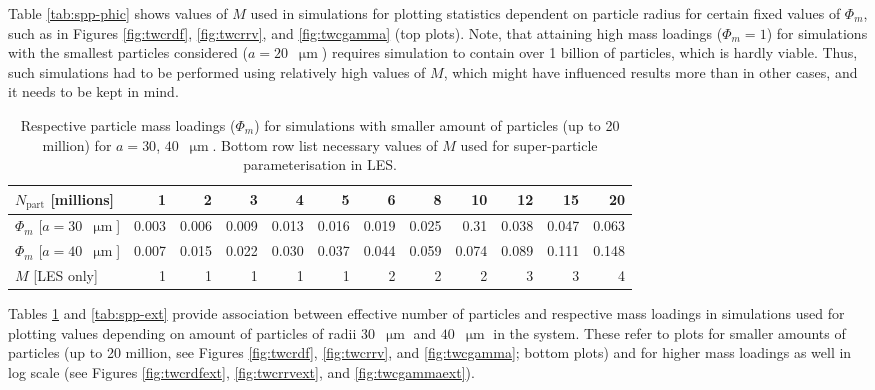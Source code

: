 \documentclass{pracamgren}
\begin{document}
Table \ref{tab:spp-phic} shows values of $M$ used in simulations for plotting statistics dependent on particle radius for certain fixed values of $\Phi_m$, such as in Figures \ref{fig:twcrdf}, \ref{fig:twcrrv}, and \ref{fig:twcgamma} (top plots).
Note, that attaining high mass loadings ($\Phi_m = 1$) for simulations with the smallest particles considered ($a = 20$~$\upmu\text{m}$) requires simulation to contain over 1 billion of particles, which is hardly viable.
Thus, such simulations had to be performed using relatively high values of $M$, which might have influenced results more than in other cases, and it needs to be kept in mind.

\begin{table}[h]
\centering
\scriptsize
\begin{tabular}{lrrrrrrrrrrr}
$N_{\text{part}}$ [millions] & 1 & 2 & 3 & 4 & 5 & 6 & 8 & 10 & 12 & 15 & 20 \\ \hline
$\Phi_m$ [$a = 30$~$\upmu\text{m}$] & 0.003 & 0.006 & 0.009 & 0.013 & 0.016 & 0.019 & 0.025 & 0.31 & 0.038 & 0.047 & 0.063 \\
$\Phi_m$ [$a = 40$~$\upmu\text{m}$] & 0.007 & 0.015 & 0.022 & 0.030 & 0.037 & 0.044 & 0.059 & 0.074 & 0.089 & 0.111 & 0.148 \\
$M$ [LES only] & 1 & 1 & 1 & 1 & 1 & 2 & 2 & 2 & 3 & 3 & 4 \\
\end{tabular}
\caption{Respective particle mass loadings ($\Phi_m$) for simulations with smaller amount of particles (up to 20 million) for $a = 30$, $40$~$\upmu\text{m}$.
Bottom row list necessary values of $M$ used for super-particle parameterisation in LES.
}
\label{tab:spp-base}
\end{table}

Tables \ref{tab:spp-base} and \ref{tab:spp-ext} provide association between effective number of particles and respective mass loadings in simulations used for plotting values depending on amount of particles of radii $30$~$\upmu\text{m}$ and $40$~$\upmu\text{m}$ in the system.
These refer to plots for smaller amounts of particles (up to 20 million, see Figures \ref{fig:twcrdf}, \ref{fig:twcrrv}, and \ref{fig:twcgamma}; bottom plots) and for higher mass loadings as well in log scale (see Figures \ref{fig:twcrdfext}, \ref{fig:twcrrvext}, and \ref{fig:twcgammaext}).
\end{document}
